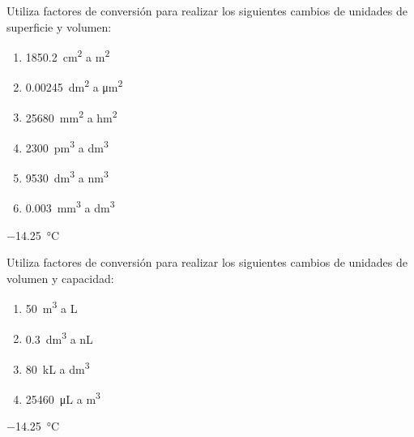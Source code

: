 \begin{exercise}[
    tags    = {unidades, factores de conversión, superficie, volumen},
    topics  = {unidades, medida, física, química},
    source  = {MERES},
  ]
  Utiliza factores de conversión para realizar los siguientes cambios de unidades de superficie y volumen:
  \begin{multicols}{2}
    \begin{enumerate}
      \item \SI{1850.2}{\square\cm} a \si{\square\m}
      \item \SI{0.00245}{\square\deca\m} a \si{\square\um}
      \item \SI{25680}{\square\mm} a \si{\square\hecto\m}
      \item \SI{2300}{\cubic\pm} a \si{\cubic\dm}
      \item \SI{9530}{\cubic\deca\m} a \si{\cubic\nm}
      \item \SI{0.003}{\cubic\mm} a \si{\cubic\deca\m}
    \end{enumerate}
  \end{multicols}
\end{exercise}

\begin{solution}
  \SI{-14,25}{\celsius}
\end{solution}




\begin{exercise}[
    tags    = {unidades, factores de conversión, capacidad, volumen},
    topics  = {unidades, medida, física, química},
    source  = {MERES},
  ]
  Utiliza factores de conversión para realizar los siguientes cambios de unidades de volumen y capacidad:
  \begin{multicols}{2}
    \begin{enumerate}
      \item \SI{50}{\cubic\m} a \si{\L}
      \item \SI{0.3}{\cubic\dm} a \si{\nano\L}
      \item \SI{80}{\kilo\L} a \si{\cubic\dm}
      \item \SI{25460}{\uL} a \si{\cubic\m}
    \end{enumerate}
  \end{multicols}
\end{exercise}

\begin{solution}
  \SI{-14,25}{\celsius}
\end{solution}




